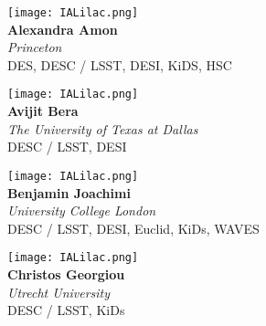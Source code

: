 \documentclass[10pt,letterpaper]{article}
\begin{document}
\begin{multicols}{2}

    \begin{minipage}[t][2in][c]{.45\textwidth}
    \centering
    \texttt{[image: IALilac.png]}\\
    \Huge \textbf{Alexandra Amon}\\
    \vspace{0.3cm}
    \Large \textit{Princeton} \\
    \vspace{0.5cm}
    \small DES, DESC / LSST, DESI, KiDS, HSC
    \end{minipage}
    \vspace{.5cm}
    
    \begin{minipage}[t][2in][c]{.45\textwidth}
    \centering
    \texttt{[image: IALilac.png]}\\
    \Huge \textbf{Avijit Bera}\\
    \vspace{0.3cm}
    \Large \textit{The University of Texas at Dallas} \\
    \vspace{0.5cm}
    \small DESC / LSST, DESI
    \end{minipage}
    \vspace{.5cm}
    
    \begin{minipage}[t][2in][c]{.45\textwidth}
    \centering
    \texttt{[image: IALilac.png]}\\
    \huge \textbf{Benjamin Joachimi}\\
    \vspace{0.3cm}
    \Large \textit{University College London} \\
    \vspace{0.5cm}
    \small DESC / LSST, DESI, Euclid, KiDs, WAVES
    \end{minipage}
    \vspace{.5cm}
    
    \begin{minipage}[t][2in][c]{.45\textwidth}
    \centering
    \texttt{[image: IALilac.png]}\\
    \huge \textbf{Christos Georgiou}\\
    \vspace{0.3cm}
    \Large \textit{Utrecht University} \\
    \vspace{0.5cm}
    \small DESC / LSST, KiDs
    \end{minipage}
    \vspace{.5cm}
    

\end{multicols}
\end{document}
